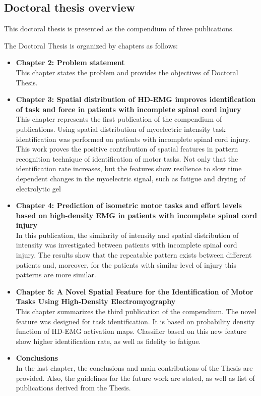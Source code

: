 \subsection {Doctoral thesis overview}

This doctoral thesis is presented as the compendium of three publications. 

The Doctoral Thesis is organized by chapters as follows:

\begin{itemize}
\item \textbf{Chapter 2: Problem statement}\\
	This chapter states the problem and provides the objectives of Doctoral Thesis.
	
\item \textbf{Chapter 3: Spatial distribution of HD-EMG improves identification of task and force in patients with incomplete spinal cord injury}\\
	This chapter represents the first publication of the compendium of publications. Using spatial distribution of myoelectric intensity task identification was performed on patients with incomplete spinal cord injury. This work proves the positive contribution of spatial features in pattern recognition technique of identification of motor tasks. Not only that the identification rate increases, but the features show resilience to slow time dependent changes in the myoelectric signal, such as fatigue and drying of electrolytic gel
	
\item \textbf{Chapter 4: Prediction of isometric motor tasks and effort levels based on high-density EMG in patients with incomplete spinal cord injury}\\
	In this publication, the similarity of intensity and spatial distribution of intensity was investigated between patients with incomplete spinal cord injury. The results show that the repeatable pattern exists between different patients and, moreover, for the patients with similar level of injury this patterns are more similar.

\item \textbf{Chapter 5: A Novel Spatial Feature for the Identification of Motor Tasks Using High-Density Electromyography}\\
	This chapter summarizes the  third publication of the compendium. The novel feature was designed for task identification. It is based on probability density function of HD-EMG activation maps. Classifier based on this new feature show higher identification rate, as well as fidelity to fatigue.

\item \textbf{Conclusions}\\
	In the last chapter, the conclusions and main contributions of the Thesis are provided. Also, the guidelines for the future work are stated, as well as list of publications derived from the Thesis.

\end{itemize}





\


